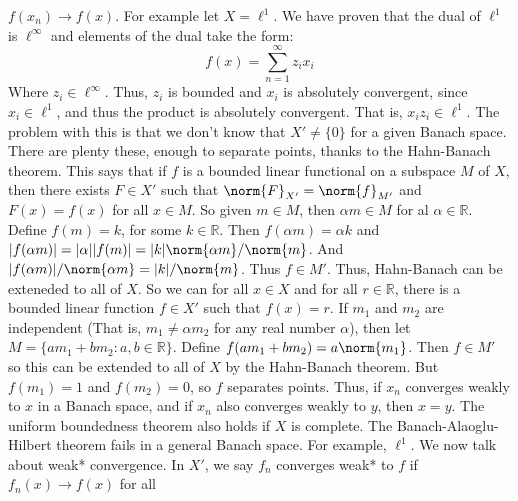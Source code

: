 \documentclass[crop=false,class=book,oneside]{standalone}                      %
\begin{document}
            $f(x_{n})\rightarrow{f(x)}$.
            For example let $X=\ell^{1}$. We have proven that the
            dual of $\ell^{1}$ is $\ell^{\infty}$ and elements
            of the dual take the form:
            \begin{equation}
                f(x)=\sum_{n=1}^{\infty}z_{i}x_{i}
            \end{equation}
            Where $z_{i}\in\ell^{\infty}$. Thus, $z_{i}$ is
            bounded and $x_{i}$ is absolutely convergent,
            since $x_{i}\in\ell^{1}$, and thus the product
            is absolutely convergent. That is,
            $x_{i}z_{i}\in\ell^{1}$. The problem with this is
            that we don't know that $X'\ne\{0\}$ for a given
            Banach space. There are plenty these, enough to
            separate points, thanks to the Hahn-Banach theorem.
            This says that if $f$ is a bounded linear functional
            on a subspace $M$ of $X$, then there exists
            $F\in{X'}$ such that
            $\norm{F}_{X'}=\norm{f}_{M'}$ and
            $F(x)=f(x)$ for all $x\in{M}$. So given $m\in{M}$,
            then $\alpha{m}\in{M}$ for al $\alpha\in\mathbb{R}$.
            Define $f(m)=k$, for some $k\in\mathbb{R}$. Then
            $f(\alpha{m})=\alpha{k}$ and
            $|f(\alpha{m})|=|\alpha||f(m)|%
             =|k|\norm{\alpha{m}}/\norm{m}$. And
             $|f(\alpha{m})|/\norm{\alpha{m}}=|k|/\norm{m}$.
            Thus $f\in{M'}$. Thus, Hahn-Banach can be exteneded
            to all of $X$. So we can for all $x\in{X}$ and for
            all $r\in\mathbb{R}$, there is a bounded linear
            function $f\in{X'}$ such that
            $f(x)=r$. If $m_{1}$ and $m_{2}$ are independent
            (That is, $m_{1}\ne\alpha{m}_{2}$ for any real
            number $\alpha$), then let
            $M=\{am_{1}+bm_{2}:a,b\in\mathbb{R}\}$. Define
            $f(am_{1}+bm_{2})=a\norm{m_{1}}$.
            Then $f\in{M'}$ so this
            can be extended to all of $X$ by the Hahn-Banach
            theorem. But $f(m_{1})=1$ and
            $f(m_{2})=0$, so $f$ separates points. Thus,
            if $x_{n}$ converges weakly to $x$ in a
            Banach space, and if $x_{n}$ also converges weakly
            to $y$, then $x=y$. The uniform boundedness theorem
            also holds if $X$ is complete. The
            Banach-Alaoglu-Hilbert theorem fails in a general
            Banach space. For example, $\ell^{1}$. We now talk
            about weak* convergence. In $X'$, we say
            $f_{n}$ converges weak* to $f$ if
            $f_{n}(x)\rightarrow{f(x)}$ for all
\end{document}
